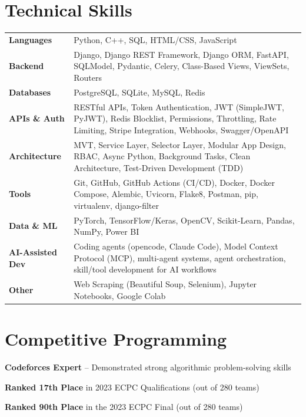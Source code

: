 \documentclass[a4paper,11pt]{article}
\begin{document}
\section{Technical Skills}
\vspace{2pt}
{\small
\renewcommand{\arraystretch}{1.4}
\begin{tabularx}{\textwidth}{@{\hspace{4pt}} l @{\hspace{12pt}} X @{}}
  \textbf{Languages}      & Python, C++, SQL, HTML/CSS, JavaScript \\
  \textbf{Backend}         & Django, Django REST Framework, Django ORM, FastAPI, SQLModel, Pydantic, Celery, Class-Based Views, ViewSets, Routers \\
  \textbf{Databases}       & PostgreSQL, SQLite, MySQL, Redis \\
  \textbf{APIs \& Auth}    & RESTful APIs, Token Authentication, JWT (SimpleJWT, PyJWT), Redis Blocklist, Permissions, Throttling, Rate Limiting, Stripe Integration, Webhooks, Swagger/OpenAPI \\
  \textbf{Architecture}    & MVT, Service Layer, Selector Layer, Modular App Design, RBAC, Async Python, Background Tasks, Clean Architecture, Test-Driven Development (TDD) \\
  \textbf{Tools}           & Git, GitHub, GitHub Actions (CI/CD), Docker, Docker Compose, Alembic, Uvicorn, Flake8, Postman, pip, virtualenv, django-filter \\
  \textbf{Data \& ML}      & PyTorch, TensorFlow/Keras, OpenCV, Scikit-Learn, Pandas, NumPy, Power BI \\
  \textbf{AI-Assisted Dev} & Coding agents (opencode, Claude Code), Model Context Protocol (MCP), multi-agent systems, agent orchestration, skill/tool development for AI workflows \\
  \textbf{Other}           & Web Scraping (Beautiful Soup, Selenium), Jupyter Notebooks, Google Colab \\
\end{tabularx}
}

\section{Competitive Programming}
\begin{itemize}[leftmargin=0.15in, label={}, itemsep=-2pt]
  \small{
    \item \textbf{Codeforces Expert} -- Demonstrated strong algorithmic problem-solving skills
    \item \textbf{Ranked 17th Place} in 2023 ECPC Qualifications (out of 280 teams)
    \item \textbf{Ranked 90th Place} in the 2023 ECPC Final (out of 280 teams)
  }
\end{itemize}
\end{document}
